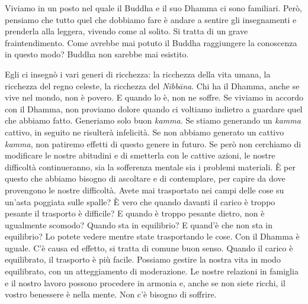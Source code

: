 Viviamo in un posto nel quale il Buddha e il suo Dhamma ci sono
familiari. Però, pensiamo che tutto quel che dobbiamo fare è andare a
sentire gli insegnamenti e prenderla alla leggera, vivendo come al
solito. Si tratta di un grave fraintendimento. Come avrebbe mai potuto
il Buddha raggiungere la conoscenza in questo modo? Buddha non sarebbe
mai esistito.

Egli ci insegnò i vari generi di ricchezza: la ricchezza della vita
umana, la ricchezza del regno celeste, la ricchezza del \emph{Nibbāna}.
Chi ha il Dhamma, anche se vive nel mondo, non è povero. E quando lo è,
non ne soffre. Se viviamo in accordo con il Dhamma, non proviamo dolore
quando ci voltiamo indietro a guardare quel che abbiamo fatto. Generiamo
solo buon \emph{kamma}. Se stiamo generando un \emph{kamma} cattivo, in
seguito ne risulterà infelicità. Se non abbiamo generato un cattivo
\emph{kamma}, non patiremo effetti di questo genere in futuro. Se però
non cerchiamo di modificare le nostre abitudini e di smetterla con le
cattive azioni, le nostre difficoltà continueranno, sia la sofferenza
mentale sia i problemi materiali. È per questo che abbiamo bisogno di
ascoltare e di contemplare, per capire da dove provengono le nostre
difficoltà. Avete mai trasportato nei campi delle cose su un'asta
poggiata sulle spalle? È vero che quando davanti il carico è troppo
pesante il trasporto è difficile? E quando è troppo pesante dietro, non
è ugualmente scomodo? Quando sta in equilibrio? E quand'è che non sta in
equilibrio? Lo potete vedere mentre state trasportando le cose. Con il
Dhamma è uguale. C'è causa ed effetto, si tratta di comune buon senso.
Quando il carico è equilibrato, il trasporto è più facile. Possiamo
gestire la nostra vita in modo equilibrato, con un atteggiamento di
moderazione. Le nostre relazioni in famiglia e il nostro lavoro possono
procedere in armonia e, anche se non siete ricchi, il vostro benessere è
nella mente. Non c'è bisogno di soffrire.

